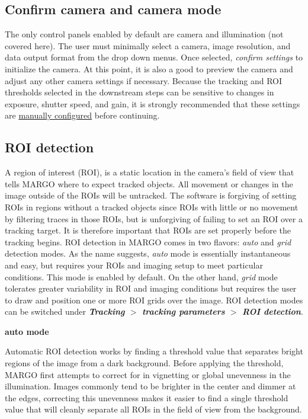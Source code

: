 \documentclass[11pt]{article}
\begin{document}
\subsection{Confirm camera and camera mode}

The only control panels enabled by default are camera and illumination (not covered here). The user must minimally select a camera, image resolution, and data output format from the drop down menus. Once selected, \textit{confirm settings} to initialize the camera. At this point, it is also a good to preview the camera and adjust any other camera settings if necessary. Because the tracking and ROI thresholds selected in the downstream steps can be sensitive to changes in exposure, shutter speed, and gain, it is strongly recommended that these settings are \hyperlink{camsettings}{manually configured} before continuing.

\hypertarget{roidetect}{\subsection{ROI detection}}

A region of interest (ROI), is a static location in the camera's field of view that tells MARGO where to expect tracked objects. All movement or changes in the image outside of the ROIs will be untracked. The software is forgiving of setting ROIs in regions without a tracked objects since ROIs with little or no movement by filtering traces in those ROIs, but is unforgiving of failing to set an ROI over a tracking target. It is therefore important that ROIs are set properly before the tracking begins. ROI detection in MARGO comes in two flavors: \textit{auto} and \textit{grid} detection modes. As the name suggests, \textit{auto} mode is essentially instantaneous and easy, but requires your ROIs and imaging setup to meet particular conditions. This mode is enabled by default. On the other hand, \textit{grid} mode tolerates greater variability in ROI and imaging conditions but requires the user to draw and position one or more ROI grids over the image. ROI detection modes can be switched under \textbf{\textit{Tracking} $>$ \textit{tracking parameters} $>$ \textit{ROI detection}}.


\textbf{auto mode}

Automatic ROI detection works by finding a threshold value that separates bright regions of the image from a dark background. Before applying the threshold, MARGO first attempts to correct for in vignetting or global unevenness in the illumination. Images commonly tend to be brighter in the center and dimmer at the edges, correcting this unevenness makes it easier to find a single threshold value that will cleanly separate all ROIs in the field of view from the background.
\end{document}
